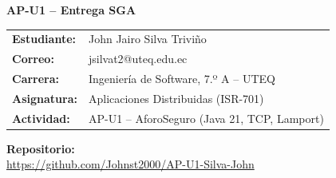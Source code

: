 \documentclass[11pt,a4paper]{article}
\begin{document}
\begin{center}{\Large\textbf{AP-U1 -- Entrega SGA}}\end{center}
\vspace{1cm}
\begin{tabular}{ll}
\textbf{Estudiante:} & John Jairo Silva Trivi\~no\\
\textbf{Correo:} & jsilvat2@uteq.edu.ec\\
\textbf{Carrera:} & Ingenier\'ia de Software, 7.º A -- UTEQ\\
\textbf{Asignatura:} & Aplicaciones Distribuidas (ISR-701)\\
\textbf{Actividad:} & AP-U1 -- AforoSeguro (Java 21, TCP, Lamport)\\
\end{tabular}

\vspace{1cm}
\textbf{Repositorio:}\\[3pt]
{\small\url{https://github.com/Johnst2000/AP-U1-Silva-John}}
\end{document}
